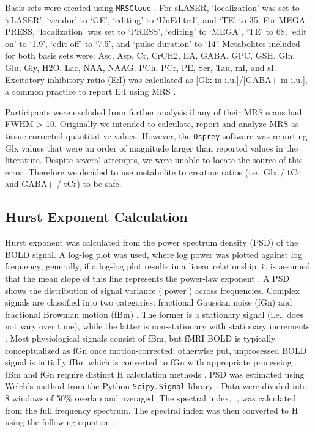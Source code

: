 \documentclass[
true
]{sn-jnl}
\begin{document}
Basis sets were created using \texttt{MRSCloud}
\citep{huiMRSCloudCloudbasedMRS2022, moriMRICloudDeliveringHighThroughput2016}.
For sLASER, `localization' was set to `sLASER', `vendor' to `GE',
`editing' to `UnEdited', and `TE' to 35. For MEGA-PRESS, `localization'
was set to `PRESS', `editing' to `MEGA', `TE' to 68, `edit on' to `1.9',
`edit off' to `7.5', and `pulse duration' to `14'. Metabolites included
for both basis sets were: Asc, Asp, Cr, CrCH2, EA, GABA, GPC, GSH, Gln,
Glu, Gly, H2O, Lac, NAA, NAAG, PCh, PCr, PE, Ser, Tau, mI, and sI.
Excitatory-inhibitory ratio (E:I) was calculated as {[}Glx in
i.u.{]}/{[}GABA+ in i.u.{]}, a common practice to report E:I using MRS
\citep{rideauxNoBalanceGlutamate+glutamine2021}.

Participants were excluded from further analysis if any of their MRS
scans had FWHM \textgreater{} 10. Originally we intended to calculate,
report and analyze MRS as tissue-corrected quantitative values. However,
the \texttt{Osprey} software was reporting Glx values that were an order
of magnitude larger than reported values in the literature. Despite
several attempts, we were unable to locate the source of this error.
Therefore we decided to use metabolite to creatine ratios (i.e.~Glx /
tCr and GABA+ / tCr) to be safe.

\subsection{Hurst Exponent
Calculation}\label{hurst-exponent-calculation}

Hurst exponent was calculated from the power spectrum density (PSD) of
the BOLD signal. A log-log plot was used, where log power was plotted
against log frequency; generally, if a log-log plot results in a linear
relationship, it is assumed that the mean slope of this line represents
the power-law exponent \citep{zimmernWhyBrainCriticality2020}. A PSD
shows the distribution of signal variance (`power') across frequencies.
Complex signals are classified into two categories: fractional Gaussian
noise (fGn) and fractional Brownian motion (fBm)
\citep{duffPowerSpectralDensity2008, ekeFractalCharacterizationComplexity2002}.
The former is a stationary signal (i.e., does not vary over time), while
the latter is non-stationary with stationary increments
\citep{ekeFractalCharacterizationComplexity2002}. Most physiological
signals consist of fBm, but fMRI BOLD is typically conceptualized as fGn
once motion-corrected; otherwise put, unprocessed BOLD signal is
initially fBm which is converted to fGn with appropriate processing
\citep{bullmoreWaveletsFunctionalMagnetic2004}. fBm and fGn require
distinct H calculation methods
\citep{ekeFractalCharacterizationComplexity2002}. PSD was estimated
using Welch's method \citep{welchUseFastFourier1967} from the Python
\texttt{Scipy.Signal} library \citep{virtanenSciPy10Fundamental2020}.
Data were divided into 8 windows of 50\% overlap and averaged. The
spectral index, , was calculated from the full frequency spectrum. The
spectral index was then converted to H using the following equation
\citep{ekeFractalCharacterizationComplexity2002, schaeferComparativeAnalysisSpectral2014}:
\end{document}

